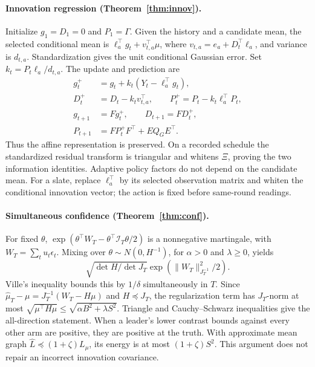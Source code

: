\documentclass[sigconf,review,anonymous]{acmart}
\newcommand{\I}{\mathcal{I}}
\begin{document}
\paragraph{Innovation regression (Theorem~\ref{thm:innov}).}
Initialize $g_1=D_1=0$ and $P_1=\Gamma$. Given the history and a candidate mean, the selected conditional mean is $\ell_a^\top g_t+v_{t,a}^\top\mu$, where $v_{t,a}=e_a+D_t^\top\ell_a$, and variance is $d_{t,a}$. Standardization gives the unit conditional Gaussian error. Set $k_t=P_t\ell_a/d_{t,a}$. The update and prediction are
\begin{align*}
g_t^+&=g_t+k_t(Y_t-\ell_a^\top g_t),\\
D_t^+&=D_t-k_tv_{t,a}^\top,\qquad P_t^+=P_t-k_t\ell_a^\top P_t,\\
g_{t+1}&=Fg_t^+,\qquad D_{t+1}=FD_t^+,\\
P_{t+1}&=FP_t^+F^\top+EQ_GE^\top.
\end{align*}
Thus the affine representation is preserved. On a recorded schedule the standardized residual transform is triangular and whitens $\Xi$, proving the two information identities. Adaptive policy factors do not depend on the candidate mean. For a slate, replace $\ell_a^\top$ by its selected observation matrix and whiten the conditional innovation vector; the action is fixed before same-round readings.

\paragraph{Simultaneous confidence (Theorem~\ref{thm:conf}).}
For fixed $\theta$, $\exp(\theta^\top W_T-\theta^\top\I_T\theta/2)$ is a nonnegative martingale, with $W_T=\sum_tu_t\epsilon_t$. Mixing over $\theta\sim N(0,H^{-1})$, for $\alpha>0$ and $\lambda\ge0$, yields
\[
\sqrt{\det H/\det J_T}\exp(\|W_T\|_{J_T^{-1}}^2/2).
\]
Ville's inequality bounds this by $1/\delta$ simultaneously in $T$. Since $\hat\mu_T-\mu=J_T^{-1}(W_T-H\mu)$ and $H\preceq J_T$, the regularization term has $J_T$-norm at most $\sqrt{\mu^\top H\mu}\le\sqrt{\alpha B^2+\lambda S^2}$. Triangle and Cauchy--Schwarz inequalities give the all-direction statement. When a leader's lower contrast bounds against every other arm are positive, they are positive at the truth. With approximate mean graph $\hat L\preceq(1+\zeta)L_\mu$, its energy is at most $(1+\zeta)S^2$. This argument does not repair an incorrect innovation covariance.
\end{document}
